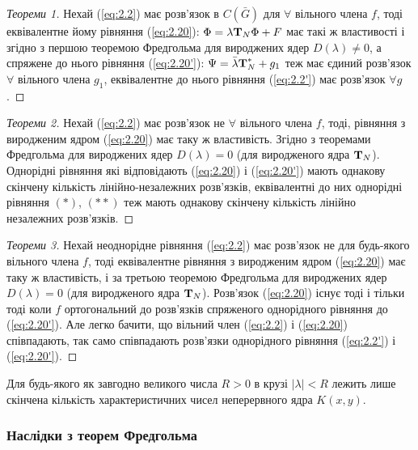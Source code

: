\begin{proof}[Теореми 1]
	Нехай (\ref{eq:2.2}) має розв'язок в $C(\bar G)$ для $\forall$ вільного члена $f$, тоді еквівалентне йому рівняння (\ref{eq:2.20}): $\Phi = \lambda \bf{T}_N \Phi + F$ має такі ж властивості і згідно з першою теоремою Фредгольма для вироджених ядер $D(\lambda) \ne 0$, а спряжене до нього рівняння (\ref{eq:2.20'}): $\Psi = \bar \lambda \bf{T}_N^* + g_1$ теж має єдиний розв'язок $\forall$ вільного члена $g_1$, еквівалентне до нього рівняння (\ref{eq:2.2'}) має розв'язок $\forall g$.
\end{proof}
\begin{proof}[Теореми 2]
	Нехай (\ref{eq:2.2}) має розв'язок не $\forall$ вільного члена $f$, тоді, рівняння з виродженим ядром (\ref{eq:2.20}) має таку ж властивість. Згідно з теоремами Фредгольма для вироджених ядер $D(\lambda) = 0$ (для виродженого ядра $\bf{T}_N$). Однорідні рівняння які відповідають (\ref{eq:2.20}) і (\ref{eq:2.20'}) мають однакову скінчену кількість лінійно-незалежних розв'язків, еквівалентні до них однорідні рівняння $(*)$, $(**)$ теж мають однакову скінчену кількість лінійно незалежних розв'язків.
\end{proof}
\begin{proof}[Теореми 3]
	Нехай неоднорідне рівняння (\ref{eq:2.2}) має розв'язок не для будь-якого вільного члена $f$, тоді еквівалентне рівняння з виродженим ядром (\ref{eq:2.20}) має таку ж властивість, і за третьою теоремою Фредгольма для вироджених ядер $D(\lambda) = 0$ (для виродженого ядра $\bf{T}_N$). Розв'язок (\ref{eq:2.20}) існує тоді і тільки тоді коли $f$ ортогональний до розв'язків спряженого однорідного рівняння до (\ref{eq:2.20'}). Але легко бачити, що вільний член (\ref{eq:2.2}) і (\ref{eq:2.20}) співпадають, так само співпадають розв'язки однорідного рівняння (\ref{eq:2.2'}) і (\ref{eq:2.20'}).
\end{proof}

\begin{theorem}
	Для будь-якого як завгодно великого числа $R > 0$ в крузі $|\lambda| < R$ лежить лише скінчена кількість характеристичних чисел неперервного ядра $K(x, y)$.
\end{theorem}

\subsubsection{Наслідки з теорем Фредгольма}

